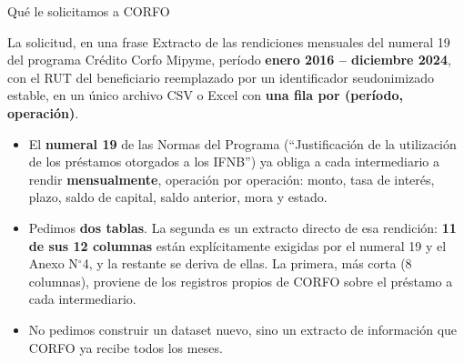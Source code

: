 \documentclass[aspectratio=169]{beamer}
\begin{document}
\begin{frame}{Qué le solicitamos a CORFO}
\begin{block}{La solicitud, en una frase}
Extracto de las rendiciones mensuales del numeral 19 del programa Crédito Corfo Mipyme, período \textbf{enero 2016 -- diciembre 2024}, con el RUT del beneficiario reemplazado por un identificador seudonimizado estable, en un único archivo CSV o Excel con \textbf{una fila por (período, operación)}.
\end{block}

\vspace{0.2cm}
\begin{itemize}
    \item El \textbf{numeral 19} de las Normas del Programa (``Justificación de la utilización de los préstamos otorgados a los IFNB'') ya obliga a cada intermediario a rendir \textbf{mensualmente}, operación por operación: monto, tasa de interés, plazo, saldo de capital, saldo anterior, mora y estado.
    \item Pedimos \textbf{dos tablas}. La segunda es un extracto directo de esa rendición: \textbf{11 de sus 12 columnas} están explícitamente exigidas por el numeral 19 y el Anexo N$^\circ$4, y la restante se deriva de ellas. La primera, más corta (8 columnas), proviene de los registros propios de CORFO sobre el préstamo a cada intermediario.
    \item \alert{No pedimos construir un dataset nuevo}, sino un extracto de información que CORFO ya recibe todos los meses.
\end{itemize}
\end{frame}
\end{document}
